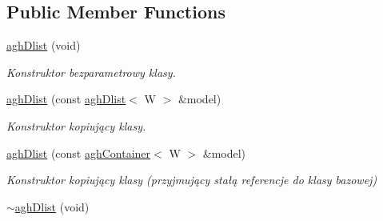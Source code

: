 \subsection*{\-Public \-Member \-Functions}
\begin{DoxyCompactItemize}
\item 
\hypertarget{classaghDlist_a8d401b6b125629a322b8173a52ae93a4}{\hyperlink{classaghDlist_a8d401b6b125629a322b8173a52ae93a4}{agh\-Dlist} (void)}\label{classaghDlist_a8d401b6b125629a322b8173a52ae93a4}

\begin{DoxyCompactList}\small\item\em \-Konstruktor bezparametrowy klasy. \end{DoxyCompactList}\item 
\hyperlink{classaghDlist_a13c8b5265bdfe11c6c85998f807ddff6}{agh\-Dlist} (const \hyperlink{classaghDlist}{agh\-Dlist}$<$ \-W $>$ \&model)
\begin{DoxyCompactList}\small\item\em \-Konstruktor kopiujący klasy. \end{DoxyCompactList}\item 
\hyperlink{classaghDlist_ae48b5adc2b8df35d9178f071adc8bcd0}{agh\-Dlist} (const \hyperlink{classaghContainer}{agh\-Container}$<$ \-W $>$ \&model)
\begin{DoxyCompactList}\small\item\em \-Konstruktor kopiujący klasy (przyjmujący stałą referencje do klasy bazowej) \end{DoxyCompactList}\item 
\hypertarget{classaghDlist_ae966338935cab5f12d55a2fa0535bc41}{\hyperlink{classaghDlist_ae966338935cab5f12d55a2fa0535bc41}{$\sim$agh\-Dlist} (void)}\label{classaghDlist_ae966338935cab5f12d55a2fa0535bc41}


\end{DoxyCompactItemize}
